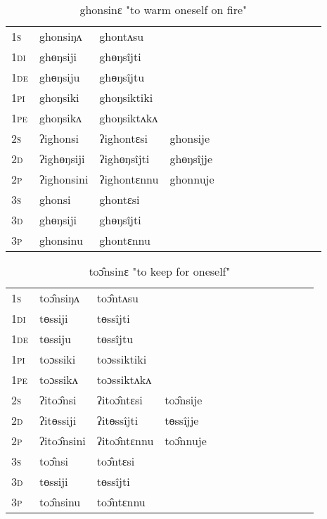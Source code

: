 \documentclass[oldfontcommands,oneside,a4paper,11pt]{article}
\begin{document}
\begin{table}[H]
\label{oŋ.vr} \centering 
\caption{ghonsinɛ  "to warm oneself on fire"  }
\begin{tabular}{l|l|l|l|l|l|l|l|l|l|l|l|l}  \toprule
\textsc{1s} &ghonsiŋʌ &ghontʌsu \\ 
\textsc{1di} &ghɵŋsiji &ghɵŋsîjti   \\
\textsc{1de} &ghɵŋsiju &ghɵŋsîjtu   \\ 
\textsc{1pi} &ghoŋsiki &ghoŋsiktiki   \\ 
\textsc{1pe} &ghoŋsikʌ &ghoŋsiktʌkʌ   \\ 
\textsc{2s} & ʔighonsi & ʔighontɛsi &ghonsije  \\ 
\textsc{2d} & ʔighɵŋsiji & ʔighɵŋsîjti &ghɵŋsîjje    \\
\textsc{2p} & ʔighonsini  & ʔighontɛnnu &ghonnuje  \\ 
\textsc{3s} & ghonsi & ghontɛsi   \\ 
\textsc{3d} & ghɵŋsiji & ghɵŋsîjti   \\ 
\textsc{3p} & ghonsinu  & ghontɛnnu \\ 
\bottomrule
\end{tabular}
\end{table}


\begin{table}[H]
\label{ot.vr} \centering 
\caption{toɔ̂nsinɛ  "to keep for oneself"  }
\begin{tabular}{l|l|l|l|l|l|l|l|l|l|l|l|l}  \toprule
\textsc{1s} &toɔ̂nsiŋʌ &toɔ̂ntʌsu \\ 
\textsc{1di} &tɵssiji &tɵssîjti   \\
\textsc{1de} &tɵssiju &tɵssîjtu   \\ 
\textsc{1pi} &toɔssiki &toɔssiktiki   \\ 
\textsc{1pe} &toɔssikʌ &toɔssiktʌkʌ   \\ 
\textsc{2s} & ʔitoɔ̂nsi & ʔitoɔ̂ntɛsi &toɔ̂nsije  \\ 
\textsc{2d} & ʔitɵssiji & ʔitɵssîjti &tɵssîjje    \\
\textsc{2p} & ʔitoɔ̂nsini  & ʔitoɔ̂ntɛnnu &toɔ̂nnuje  \\ 
\textsc{3s} & toɔ̂nsi & toɔ̂ntɛsi   \\ 
\textsc{3d} & tɵssiji & tɵssîjti   \\ 
\textsc{3p} & toɔ̂nsinu  & toɔ̂ntɛnnu \\ 
\bottomrule
\end{tabular}
\end{table}
\end{document}
